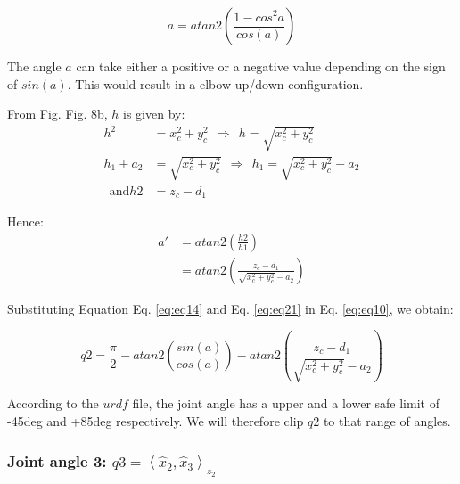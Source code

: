 \documentclass[a4paper,12pt]{report}
\begin{document}
\begin{equation} 
\label{eq:eq14}
a = atan2 \left( \frac{1 - cos^2 a}{cos(a)} \right)
\end{equation}

The angle $a$ can take either a positive or a negative value depending on the sign of $sin(a)$. This would result in a elbow up/down configuration.


From Fig. Fig. 8b, $h$ is given by:
\begin{align}
h^2  &=  x_c ^2 + y_c ^2  \ \ \Rightarrow \ \ h= \sqrt{x_c ^2 + y_c ^2} \\
h_1 + a_2 &= \sqrt{x_c ^2 + y_c ^2} \ \ \Rightarrow \ \ h_1 = \sqrt{x_c ^2 + y_c ^2} - a_2 \\
\ \ \text{and} h2  &=  z_c - d_1
\end{align}


Hence:
\begin{align} 
\label{eq:eq21}
a' &= atan2\left( \frac{h2}{h1} \right) \\
 &= atan2 \left( \frac{z_c - d_1}{ \sqrt{x_c ^2 + y_c ^2} - a_2 } \right)
\end{align}


Substituting Equation Eq. \ref{eq:eq14}  and Eq. \ref{eq:eq21} in Eq. \ref{eq:eq10}, we obtain:

\begin{equation}
q2 = \frac{\pi}{2} - atan2\left( \frac{sin(a)}{cos(a)} \right) - atan2 \left( \frac{z_c - d_1}{ \sqrt{x_c ^2 + y_c ^2} - a_2 } \right)
\end{equation}

According to the $urdf$ file, the joint angle has a upper and a lower safe limit  of -45deg and +85deg respectively. We will therefore clip $q2$ to that range of angles.  

\subsubsection{Joint angle 3: $q3 = \left< \hat{x}_2, \hat{x}_3 \right> _{z_2} $}
\end{document}
